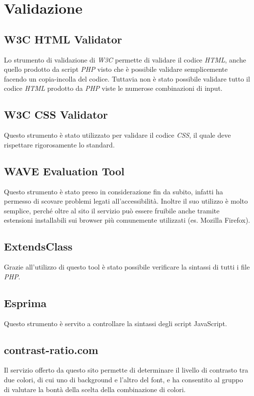 \section{Validazione}

\subsection{W3C HTML Validator}
Lo strumento di validazione di \textit{W3C} permette di validare il codice \textit{HTML}, anche quello
prodotto da script \textit{PHP} visto che è possibile validare semplicemente facendo un copia-incolla del
codice. Tuttavia non è stato possibile validare tutto il codice \textit{HTML} prodotto da \textit{PHP}
viste le numerose combinazioni di input.

\subsection{W3C CSS Validator}
Questo strumento è stato utilizzato per validare il codice \textit{CSS}, il quale deve rispettare
rigorosamente lo standard.

\subsection{WAVE Evaluation Tool}
Questo strumento è stato preso in considerazione fin da subito, infatti ha permesso di scovare problemi
legati all'accessibilità. Inoltre il suo utilizzo è molto semplice, perché oltre al sito
il servizio può essere fruibile anche tramite estensioni installabili sui browser più comunemente
utilizzati (es. Mozilla Firefox).

\subsection{ExtendsClass}
Grazie all'utilizzo di questo tool è stato possibile verificare la sintassi di tutti i file \textit{PHP}.

\subsection{Esprima}
Questo strumento è servito a controllare la sintassi degli script JavaScript.

\subsection{contrast-ratio.com}
Il servizio offerto da questo sito permette di determinare il livello di contrasto tra due colori, di cui
uno di background e l'altro del font, e ha consentito al gruppo di valutare la bontà della scelta della
combinazione di colori.